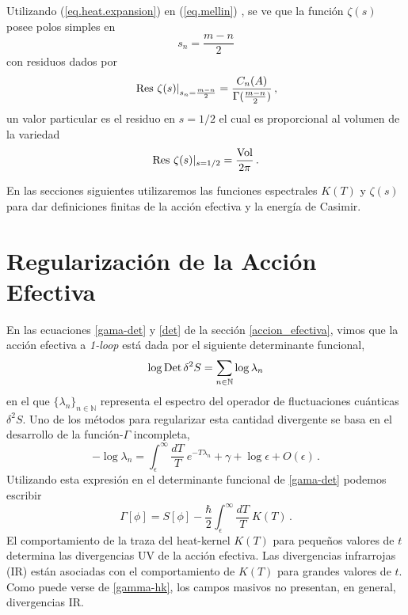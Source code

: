 Utilizando (\ref{eq.heat.expansion}) en  (\ref{eq.mellin}) , se ve que la función $\zeta (s)$ posee polos simples en
\begin{equation}
s _n = \frac{m-n}{2} 
\label{eq.ceros.zeta}
\end{equation}
con residuos dados por
\begin{equation}
\left. {\rm Res} \ \zeta  (s)  \right| _{s_n= \frac{m - n}{2}} =  
\frac{ C_n  (A) }{ {\Gamma ( \frac{m-n}{2}} ) }
	\, ,
\label{losresi}
\end{equation}
un valor particular es el residuo en $s=1/2$ el cual es proporcional al volumen de la variedad
\begin{equation}\label{eq.vol}
	{\rm Res} \ \zeta (s) | _{s=1/2} = \frac{ {\rm Vol} }{2 \pi} \, .
\end{equation}


En las secciones siguientes utilizaremos las funciones espectrales $K(T)$ y $\zeta(s) $ para dar definiciones finitas de la acción efectiva y la energía de Casimir.

\section{Regularización de la Acción Efectiva}\label{cap.acc}

En las ecuaciones \ref{gama-det} y \ref{det} de la sección \ref{accion_efectiva}, vimos que la acción efectiva a {\it 1-loop} está dada por el siguiente determinante funcional,
\begin{equation}
\log {\rm Det} \, \delta ^2 S = 
\sum_{n\in{\mathbb N}} \log \lambda _n
\end{equation}
en el que $\{\lambda_n\}_{n\in\mathbb N}$ representa el espectro del operador de fluctuaciones cuánticas $\delta^2S$. Uno de los métodos para regularizar esta cantidad divergente se basa en el desarrollo de la función-$\Gamma$ incompleta,
\begin{equation}
- \log\lambda_n=\int _ { \epsilon } ^{\infty}\frac{dT}{T}\ e ^{- T \lambda _n} +\gamma+\log\epsilon + O ( \epsilon  ) \,.
\end{equation}
Utilizando esta expresión en el determinante funcional de \eqref{gama-det} podemos escribir
\begin{equation}\label{gamma-hk}
\Gamma [ \phi ] = 
S[ \phi ] - 
\frac{\hbar }{2}
\int _ { \epsilon } ^{\infty} \frac{ dT}{T}\ K(T) \, .
\end{equation}
El comportamiento de la traza del heat-kernel $K(T)$ para pequeños valores de $t$ determina las divergencias UV de la acción efectiva. Las divergencias infrarrojas (IR) están asociadas con el comportamiento de $K(T)$ para grandes valores de $t$. Como puede verse de \eqref{gamma-hk}, los campos masivos no presentan, en general, divergencias IR.

